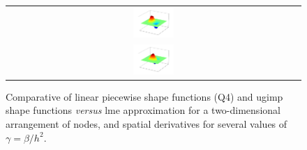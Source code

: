 \documentclass[preprint,12pt,a4paper]{elsarticle}
\begin{document}
\begin{figure}
{\begin{tabular}{c}
      \includegraphics[width=0.14\textwidth]{Figures/GIMP_Shape_Fun_dx}\\
      \includegraphics[width=0.14\textwidth]{Figures/GIMP_Shape_Fun_dy}
    \end{tabular}
  }
  \caption{Comparative of linear piecewise shape functions (Q4) and
    \acrshort{ugimp} shape functions \textit{versus}  \acrshort{lme}
    approximation for a two-dimensional arrangement of nodes, and
    spatial derivatives for several values of $\gamma = \beta/h^2$.}
  \label{fig:LME_MPM}
\end{figure}
\end{document}
